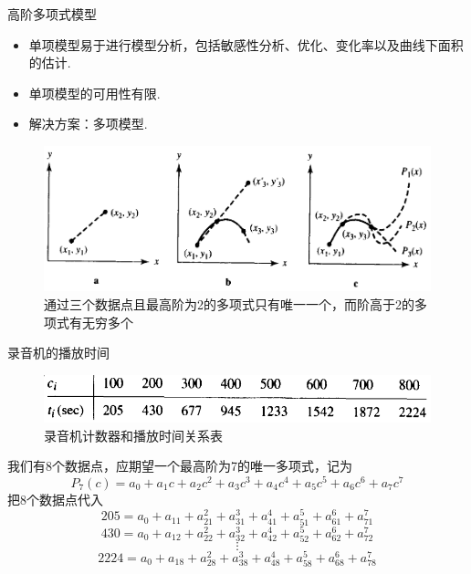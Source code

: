 \documentclass[UTF8]{ctexbeamer}
\begin{document}
\begin{frame}{高阶多项式模型}

  \begin{itemize}
  \item 单项模型易于进行模型分析，包括敏感性分析、优化、变化率以及曲线下面积的估计.
  \item 单项模型的可用性有限.
  \item 解决方案：多项模型.
  \end{itemize}

  \begin{figure}
    \centering
    \includegraphics[width=.8\textwidth{}]{unique-poly.png}
    \caption{通过三个数据点且最高阶为2的多项式只有唯一一个，而阶高于2的多项式有无穷多个}
  \end{figure}
  
\end{frame}

\begin{frame}{录音机的播放时间}
  \begin{figure}
    \centering
    \includegraphics[width=.6\textwidth{}]{record-tab.png}
    \caption{录音机计数器和播放时间关系表}
  \end{figure}
  我们有8个数据点，应期望一个最高阶为7的唯一多项式，记为
  \[
  P_7(c) = a_0 + a_1c + a_2c^2 + a_3c^3 + a_4c^4 + a_5c^5 + a_6c^6 + a_7c^7
  \]
  把8个数据点代入
  \[
  205 = a_0 + a_11 + a_21^2 + a_31^3 + a_41^4 + a_51^5 + a_61^6 + a_71^7
  \]
  \[
  430 = a_0 + a_12 + a_22^2 + a_32^3 + a_42^4 + a_52^5 + a_62^6 + a_72^7
  \]
  \[
  \vdots
  \]
  \[
  2224 = a_0 + a_18 + a_28^2 + a_38^3 + a_48^4 + a_58^5 + a_68^6 + a_78^7
  \]
\end{frame}
\end{document}
